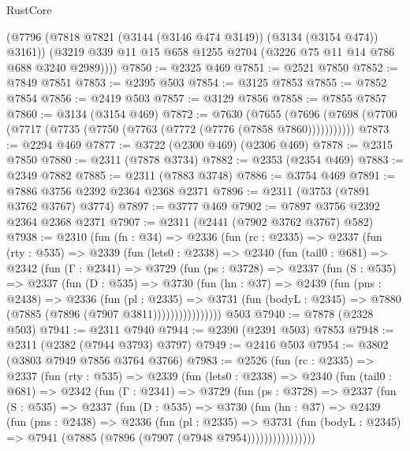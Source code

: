 \begin{lexlean}{RustCore}
\begin{coremodule}
        (@7796 (@7818 @7821 (@3144 (@3146 @474 @3149)) (@3134 (@3154 @474)) @3161))
        (@3219 @339 @11 @15 @658 @1255 @2704 (@3226 @75 @11 @14 @786 @688 @3240 @2989))))
@7850 := @2325 @469
@7851 := @2521 @7850
@7852 := @7849 @7851
@7853 := @2395 @503
@7854 := @3125 @7853
@7855 := @7852 @7854
@7856 := @2419 @503
@7857 := @3129 @7856
@7858 := @7855 @7857
@7860 := @3134 (@3154 @469)
@7872 := @7630
    (@7655 (@7696 (@7698 (@7700 (@7717 (@7735 (@7750 (@7763 (@7772 (@7776 (@7858 @7860)))))))))))
@7873 := @2294 @469
@7877 := @3722 (@2300 @469) (@2306 @469)
@7878 := @2315 @7850
@7880 := @2311 (@7878 @3734)
@7882 := @2353 (@2354 @469)
@7883 := @2349 @7882
@7885 := @2311 (@7883 @3748)
@7886 := @3754 @469
@7891 := @7886 @3756 @2392 @2364 @2368 @2371
@7896 := @2311 (@3753 (@7891 @3762 @3767) @3774)
@7897 := @3777 @469
@7902 := @7897 @3756 @2392 @2364 @2368 @2371
@7907 := @2311 (@2441 (@7902 @3762 @3767) @582)
@7938 := @2310
    (fun (fn : @34) =>
    @2336
      (fun (rc : @2335) =>
      @2337
        (fun (rty : @535) =>
        @2339
          (fun (lets0 : @2338) =>
          @2340
            (fun (tail0 : @681) =>
            @2342
              (fun (Γ : @2341) =>
              @3729
                (fun (ps : @3728) =>
                @2337
                  (fun (S : @535) =>
                  @2337
                    (fun (D : @535) =>
                    @3730
                      (fun (hn : @37) =>
                      @2439
                        (fun (pns : @2438) =>
                        @2336
                          (fun (pl : @2335) =>
                          @3731
                            (fun (bodyL : @2345) => @7880 (@7885 (@7896 (@7907 @3811))))))))))))))))
    @503
@7940 := @7878 (@2328 @503)
@7941 := @2311 @7940
@7944 := @2390 (@2391 @503) @7853
@7948 := @2311 (@2382 (@7944 @3793) @3797)
@7949 := @2416 @503
@7954 := @3802 (@3803 @7949 @7856 @3764 @3766)
@7983 := @2526
    (fun (rc : @2335) =>
    @2337
      (fun (rty : @535) =>
      @2339
        (fun (lets0 : @2338) =>
        @2340
          (fun (tail0 : @681) =>
          @2342
            (fun (Γ : @2341) =>
            @3729
              (fun (ps : @3728) =>
              @2337
                (fun (S : @535) =>
                @2337
                  (fun (D : @535) =>
                  @3730
                    (fun (hn : @37) =>
                    @2439
                      (fun (pns : @2438) =>
                      @2336
                        (fun (pl : @2335) =>
                        @3731
                          (fun (bodyL : @2345) =>
                          @7941 (@7885 (@7896 (@7907 (@7948 @7954))))))))))))))))

\end{coremodule}
\end{lexlean}
